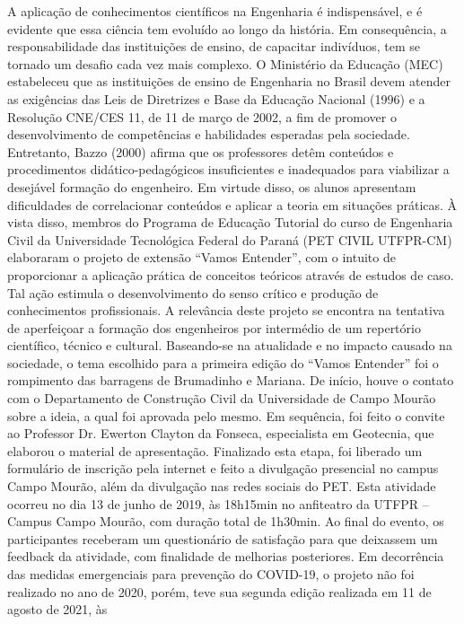 A aplicação de conhecimentos científicos na Engenharia é indispensável, e é evidente que 
essa ciência tem evoluído ao longo da história. Em consequência, a responsabilidade das 
instituições de ensino, de capacitar indivíduos, tem se tornado um desafio cada vez mais complexo.
O Ministério da Educação (MEC) estabeleceu que as instituições de ensino de Engenharia no 
Brasil devem atender as exigências das Leis de Diretrizes e Base da Educação Nacional (1996) e 
a Resolução CNE/CES 11, de 11 de março de 2002, a fim de promover o desenvolvimento de 
competências e habilidades esperadas pela sociedade. Entretanto, Bazzo (2000) afirma que os 
professores detêm conteúdos e procedimentos didático-pedagógicos insuficientes e inadequados 
para viabilizar a desejável formação do engenheiro. Em virtude disso, os alunos apresentam 
dificuldades de correlacionar conteúdos e aplicar a teoria em situações práticas. À vista disso, 
membros do Programa de Educação Tutorial do curso de Engenharia Civil da Universidade 
Tecnológica Federal do Paraná (PET CIVIL UTFPR-CM) elaboraram o projeto de extensão 
“Vamos Entender”, com o intuito de proporcionar a aplicação prática de conceitos teóricos através 
de estudos de caso. Tal ação estimula o desenvolvimento do senso crítico e produção de 
conhecimentos profissionais. A relevância deste projeto se encontra na tentativa de aperfeiçoar a 
formação dos engenheiros por intermédio de um repertório científico, técnico e cultural.
Baseando-se na atualidade e no impacto causado na sociedade, o tema escolhido para a 
primeira edição do “Vamos Entender” foi o rompimento das barragens de Brumadinho e Mariana. 
De início, houve o contato com o Departamento de Construção Civil da Universidade de Campo 
Mourão sobre a ideia, a qual foi aprovada pelo mesmo. Em sequência, foi feito o convite ao 
Professor Dr. Ewerton Clayton da Fonseca, especialista em Geotecnia, que elaborou o material de 
apresentação. Finalizado esta etapa, foi liberado um formulário de inscrição pela internet e feito a 
divulgação presencial no campus Campo Mourão, além da divulgação nas redes sociais do PET. 
Esta atividade ocorreu no dia 13 de junho de 2019, às 18h15min no anfiteatro da UTFPR – Campus 
Campo Mourão, com duração total de 1h30min. Ao final do evento, os participantes receberam 
um questionário de satisfação para que deixassem um feedback da atividade, com finalidade de 
melhorias posteriores.
Em decorrência das medidas emergenciais para prevenção do COVID-19, o projeto não foi 
realizado no ano de 2020, porém, teve sua segunda edição realizada em 11 de agosto de 2021, às 
